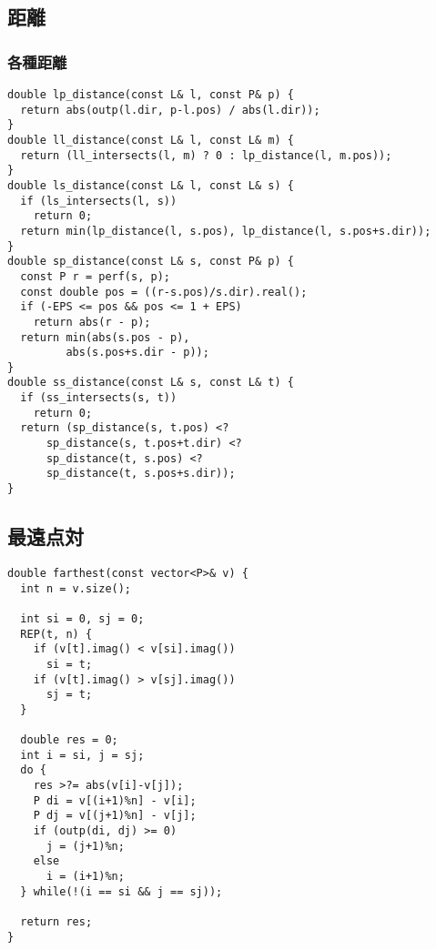 \subsection{距離}


\subsubsection{各種距離}

\begin{lstlisting}
double lp_distance(const L& l, const P& p) {
  return abs(outp(l.dir, p-l.pos) / abs(l.dir));
}
double ll_distance(const L& l, const L& m) {
  return (ll_intersects(l, m) ? 0 : lp_distance(l, m.pos));
}
double ls_distance(const L& l, const L& s) {
  if (ls_intersects(l, s))
    return 0;
  return min(lp_distance(l, s.pos), lp_distance(l, s.pos+s.dir));
}
double sp_distance(const L& s, const P& p) {
  const P r = perf(s, p);
  const double pos = ((r-s.pos)/s.dir).real();
  if (-EPS <= pos && pos <= 1 + EPS)
    return abs(r - p);
  return min(abs(s.pos - p),
         abs(s.pos+s.dir - p));
}
double ss_distance(const L& s, const L& t) {
  if (ss_intersects(s, t))
    return 0;
  return (sp_distance(s, t.pos) <?
      sp_distance(s, t.pos+t.dir) <?
      sp_distance(t, s.pos) <?
      sp_distance(t, s.pos+s.dir));
}
\end{lstlisting}


\subsection{最遠点対}



\begin{lstlisting}
double farthest(const vector<P>& v) {
  int n = v.size();

  int si = 0, sj = 0;
  REP(t, n) {
    if (v[t].imag() < v[si].imag())
      si = t;
    if (v[t].imag() > v[sj].imag())
      sj = t;
  }

  double res = 0;
  int i = si, j = sj;
  do {
    res >?= abs(v[i]-v[j]);
    P di = v[(i+1)%n] - v[i];
    P dj = v[(j+1)%n] - v[j];
    if (outp(di, dj) >= 0)
      j = (j+1)%n;
    else
      i = (i+1)%n;
  } while(!(i == si && j == sj));

  return res;
}
\end{lstlisting}



